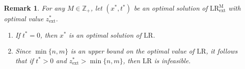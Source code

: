 \documentclass[preprint, 11pt, authoryear]{elsarticle}
\newtheorem{remark}{Remark}[section]
\newcommand{\Z}{{\mathbb Z}}
\newcommand{\setcoveringformLR}{\text{LR}}
\newcommand{\setcoveringformLRM}{\text{LR}^{\text{M}}_{\text{ext}}}
\begin{document}






\begin{remark}
\label{remark.M}
For any $M \in \Z_+$, let $(x^*, t^*)$ be an optimal solution of $\setcoveringformLRM$ with optimal value $z^*_{\mathrm{ext}}$.
\begin{enumerate}
    \item If $t^* = 0$, then $x^*$ is an optimal solution of $\setcoveringformLR$.
    
    \item Since $\min\{n,m\}$ is an upper bound on the optimal value of $\setcoveringformLR$, it follows that if $t^* > 0$ and $z^*_{\mathrm{ext}} > \min\{n,m\}$, then $\setcoveringformLR$ is infeasible.
\end{enumerate}
\end{remark}
\end{document}
